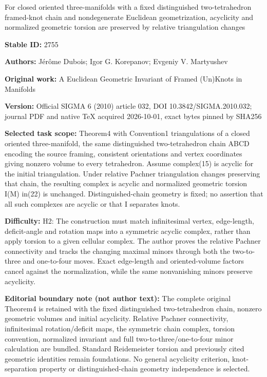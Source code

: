\documentclass[11pt]{article}
\begin{document}
\begin{center}\Large For closed oriented three-manifolds with a fixed distinguished two-tetrahedron framed-knot chain and nondegenerate Euclidean geometrization, acyclicity and normalized geometric torsion are preserved by relative triangulation changes\end{center}
\noindent\textbf{Stable ID:} 2755\par
\noindent\textbf{Authors:} Jérôme Dubois; Igor G. Korepanov; Evgeniy V. Martyushev\par
\noindent\textbf{Original work:} A Euclidean Geometric Invariant of Framed (Un)Knots in Manifolds\par
\noindent\textbf{Version:} Official SIGMA 6 (2010) article 032, DOI 10.3842/SIGMA.2010.032; journal PDF and native TeX acquired 2026-10-01, exact bytes pinned by SHA256\par
\noindent\textbf{Selected task scope:} Theorem4 with Convention1 triangulations of a closed oriented three-manifold, the same distinguished two-tetrahedron chain ABCD encoding the source framing, consistent orientations and vertex coordinates giving nonzero volume to every tetrahedron. Assume complex(15) is acyclic for the initial triangulation. Under relative Pachner triangulation changes preserving that chain, the resulting complex is acyclic and normalized geometric torsion I(M) in(22) is unchanged. Distinguished-chain geometry is fixed; no assertion that all such complexes are acyclic or that I separates knots.\par
\noindent\textbf{Difficulty:} H2: The construction must match infinitesimal vertex, edge-length, deficit-angle and rotation maps into a symmetric acyclic complex, rather than apply torsion to a given cellular complex. The author proves the relative Pachner connectivity and tracks the changing maximal minors through both the two-to-three and one-to-four moves. Exact edge-length and oriented-volume factors cancel against the normalization, while the same nonvanishing minors preserve acyclicity.\par
\noindent\textbf{Editorial boundary note (not author text):} The complete original Theorem4 is retained with the fixed distinguished two-tetrahedron chain, nonzero geometric volumes and initial acyclicity. Relative Pachner connectivity, infinitesimal rotation/deficit maps, the symmetric chain complex, torsion convention, normalized invariant and full two-to-three/one-to-four minor calculation are bundled. Standard Reidemeister torsion and previously cited geometric identities remain foundations. No general acyclicity criterion, knot-separation property or distinguished-chain geometry independence is selected.\par
\end{document}
